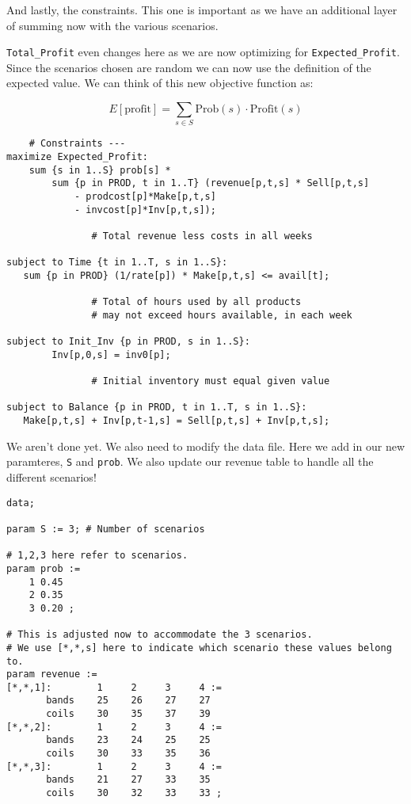 And lastly, the constraints. This one is important as we have an additional layer of summing now with the various scenarios.

\texttt{Total\_Profit} even changes here as we are now optimizing for \texttt{Expected\_Profit}. Since the scenarios chosen are random we can now use the definition of the expected value. We can think of this new objective function as:

\[
    E[\text{profit}] = \sum_{s \in S} \text{Prob}(s) \cdot \text{Profit}(s)
\]

\begin{lstlisting}
    # Constraints ---
maximize Expected_Profit:
    sum {s in 1..S} prob[s] *
        sum {p in PROD, t in 1..T} (revenue[p,t,s] * Sell[p,t,s]
            - prodcost[p]*Make[p,t,s]
            - invcost[p]*Inv[p,t,s]);

               # Total revenue less costs in all weeks

subject to Time {t in 1..T, s in 1..S}:
   sum {p in PROD} (1/rate[p]) * Make[p,t,s] <= avail[t];

               # Total of hours used by all products
               # may not exceed hours available, in each week

subject to Init_Inv {p in PROD, s in 1..S}:
        Inv[p,0,s] = inv0[p];

               # Initial inventory must equal given value

subject to Balance {p in PROD, t in 1..T, s in 1..S}:
   Make[p,t,s] + Inv[p,t-1,s] = Sell[p,t,s] + Inv[p,t,s];
\end{lstlisting}

We aren't done yet. We also need to modify the data file. Here we add in our new paramteres, \texttt{S} and \texttt{prob}. We also update our revenue table to handle all the different scenarios!

\begin{lstlisting}
data;

param S := 3; # Number of scenarios

# 1,2,3 here refer to scenarios.
param prob :=
    1 0.45
    2 0.35
    3 0.20 ;

# This is adjusted now to accommodate the 3 scenarios.
# We use [*,*,s] here to indicate which scenario these values belong to.
param revenue :=
[*,*,1]:        1     2     3     4 :=
       bands    25    26    27    27
       coils    30    35    37    39
[*,*,2]:        1     2     3     4 :=
       bands    23    24    25    25
       coils    30    33    35    36
[*,*,3]:        1     2     3     4 :=
       bands    21    27    33    35
       coils    30    32    33    33 ;
\end{lstlisting}

